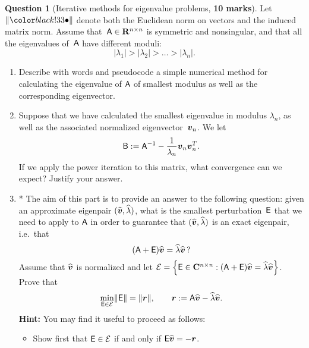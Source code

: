 \documentclass[11pt]{article}
\theoremstyle{definition}
\newtheorem{question}{Question}
\theoremstyle{remark}
\theoremstyle{plain}%
\begin{document}
\newpage
\begin{question}
    [Iterative methods for eigenvalue problems, \textbf{10 marks}]
    Let $\norm{\placeholder}$ denote both the Euclidean norm on vectors and the induced matrix norm.
    Assume that~$\mathsf A \in \mathbf R^{n \times n}$ is symmetric and nonsingular,
    and that all the eigenvalues of~$\mathsf A$ have different moduli:
    \[
        \lvert \lambda_1 \rvert
        >
        \lvert \lambda_2 \rvert
        >
        \dots
        >
        \lvert \lambda_n \rvert.
    \]

    \begin{enumerate}
        \item
            Describe with words and pseudocode a simple numerical method for calculating the eigenvalue of $\mathsf A$ of smallest modulus
            as well as the corresponding eigenvector.

        \item
            Suppose that we have calculated the smallest eigenvalue in modulus $\lambda_n$,
            as well as the associated normalized eigenvector~$\mathbf{\boldsymbol{v}}_n$.
            We let
            \[
                \mathsf B := \mathsf A^{-1} - \frac{1}{\lambda_n} \mathbf{\boldsymbol{v}}_n \mathbf{\boldsymbol{v}}_n^T.
            \]
            If we apply the power iteration to this matrix,
            what convergence can we expect?
            Justify your answer.


        \item
            *
            The aim of this part is to provide an answer to the following question:
            given an approximate eigenpair $(\widehat {\mathbf{\boldsymbol{v}}}, \widehat \lambda)$,
            what is the smallest perturbation~$\mathsf E$ that we need to apply to $\mathsf A$ in order to guarantee that
            $(\widehat {\mathbf{\boldsymbol{v}}}, \widehat \lambda)$ is an exact eigenpair, i.e.\ that
            \[
                (\mathsf A + \mathsf E) \widehat {\mathbf{\boldsymbol{v}}} = \widehat \lambda \widehat {\mathbf{\boldsymbol{v}}} \,?
            \]
            Assume that $\widehat {\mathbf{\boldsymbol{v}}}$ is normalized and
            let $\mathcal E = \Bigl\{\mathsf E \in \mathbf C^{n \times n}: (\mathsf A + \mathsf E) \widehat {\mathbf{\boldsymbol{v}}} = \widehat \lambda \widehat {\mathbf{\boldsymbol{v}}} \Bigr\}$.
            Prove that
            \begin{equation}
                \label{eq:kahan_parlett_jiang}
                \min_{\mathsf E \in \mathcal E} \lVert\mathsf E\rVert = \lVert\mathbf{\boldsymbol{r}}\rVert, \qquad \mathbf{\boldsymbol{r}} := \mathsf A \widehat {\mathbf{\boldsymbol{v}}} - \widehat \lambda \widehat {\mathbf{\boldsymbol{v}}}.
            \end{equation}
            \textbf{Hint:} You may find it useful to proceed as follows:
            \begin{itemize}
                \item
                    Show first that $\mathsf E \in \mathcal E$ if and only if $\mathsf E \widehat {\mathbf{\boldsymbol{v}}} = - \mathbf{\boldsymbol{r}}$.


\end{itemize}
\end{enumerate}
\end{question}
\end{document}
